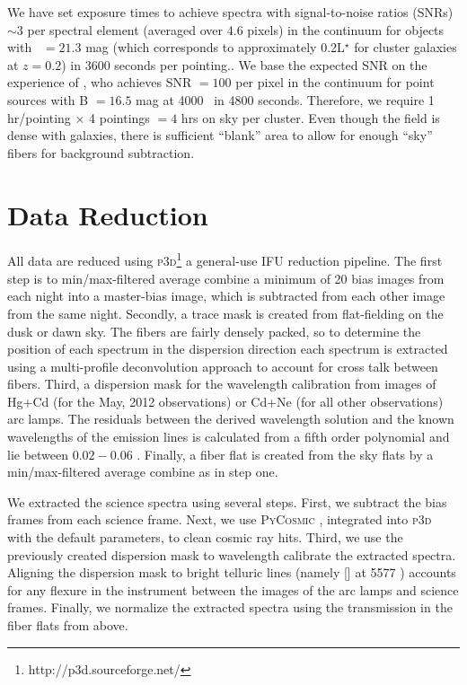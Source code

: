 We have set exposure times to achieve spectra with signal-to-noise ratios (SNRs) $\sim3$ per spectral element (averaged over 4.6 pixels) in the continuum for objects with \sdssg\ $= 21.3$ mag (which corresponds to approximately 0.2L$^\star$ for cluster galaxies at $z = 0.2$) in 3600 seconds per pointing.. We base the expected SNR on the experience of \cite{Shetrone2010}, who achieves SNR $= 100$ per pixel in the continuum for point sources with B $=16.5$ mag at 4000 \AAA\ in 4800 seconds. Therefore, we require 1 hr/pointing $\times$ 4 pointings $= 4$ hrs on sky per cluster. Even though the field is dense with galaxies, there is sufficient ``blank'' area to allow for enough ``sky'' fibers for background subtraction.

\section{Data Reduction}\label{2sec:data reduction} 
All data are reduced using \textsc{p3d}\footnote{http://p3d.sourceforge.net/} \citep{Sandin2010} a general-use IFU reduction pipeline. The first step is to min/max-filtered average combine a minimum of 20 bias images from each night into a master-bias image, which is subtracted from each other image from the same night. Secondly, a trace mask is created from flat-fielding on the dusk or dawn sky. The fibers are fairly densely packed, so to determine the position of each spectrum in the dispersion direction each spectrum is extracted using a multi-profile deconvolution approach \citep{Sharp2010} to account for cross talk between fibers. Third, a dispersion mask for the wavelength calibration from images of Hg+Cd (for the May, 2012 observations) or Cd+Ne (for all other observations) arc lamps. The residuals between the derived wavelength solution and the known wavelengths of the emission lines is calculated from a fifth order polynomial and lie between $0.02 - 0.06$ \AAA. Finally, a fiber flat is created from the sky flats by a min/max-filtered average combine as in step one. 

We extracted the science spectra using several steps. First, we subtract the bias frames from each science frame. Next, we use \textsc{PyCosmic} \citep{Husemann2012}, integrated into \textsc{p3d} with the default parameters, to clean cosmic ray hits. Third, we use the previously created dispersion mask to wavelength calibrate the extracted spectra. Aligning the dispersion mask to bright telluric lines (namely \hbox{[]} at 5577 \AAA) accounts for any flexure in the instrument between the images of the arc lamps and science frames. Finally, we normalize the extracted spectra using the transmission in the fiber flats from above. 

